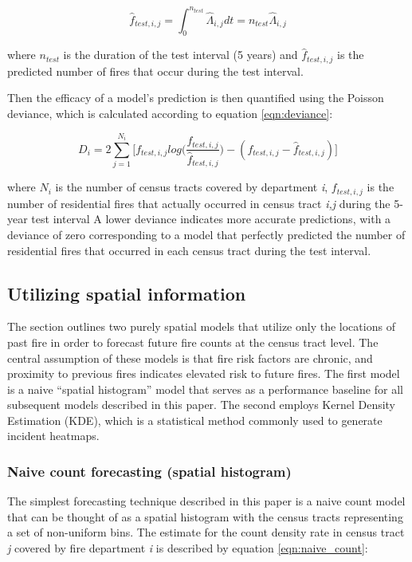 \documentclass{svjour3}
\begin{document}
\begin{equation}
  \label{eqn:rate_integral}
  \hat{f}_{test,i,j} = \int_{0}^{n_{test}}\hat\Lambda_{i,j}dt
  = n_{test}\hat\Lambda_{i,j}
\end{equation}

\noindent where $n_{test}$ is the duration of the test interval (5 years) and $\hat{f}_{test,i,j}$ is the predicted number of fires that occur during the test interval.

Then the efficacy of a model's prediction is then quantified using the Poisson deviance, which is calculated according to equation \ref{eqn:deviance}:

\begin{equation}
  \label{eqn:deviance}
  D_i = 2\sum_{j=1}^{N_i}\bigg[
   f_{test,i,j}log\big(\frac{f_{test,i,j}}{\hat{f}_{test,i,j}}\big) - 
   (f_{test,i,j}-\hat{f}_{test,i,j}) 
  \bigg]
\end{equation}

\noindent where $N_i$ is the number of census tracts covered by department \textit{i}, $f_{test,i,j}$ is the number of residential fires that actually occurred in census tract \textit{i,j} during the 5-year test interval A lower deviance indicates more accurate predictions, with a deviance of zero corresponding to a model that perfectly predicted the number of residential fires that occurred in each census tract during the test interval.



\subsection{Utilizing spatial information}
The section outlines two purely spatial models that utilize only the locations of past fire in order to forecast future fire counts at the census tract level. The central assumption of these models is that fire risk factors are chronic, and proximity to previous fires indicates elevated risk to future fires. The first model is a naive ``spatial histogram'' model that serves as a performance baseline for all subsequent models described in this paper. The second employs Kernel Density Estimation (KDE), which is a statistical method commonly used to generate incident heatmaps. 

\subsubsection{Naive count forecasting (spatial histogram)}
The simplest forecasting technique described in this paper is a naive count model that can be thought of as a spatial histogram with the census tracts representing a set of non-uniform bins. The estimate for the count density rate in census tract \textit{j} covered by fire department \textit{i} is described by equation \ref{eqn:naive_count}:
\end{document}
